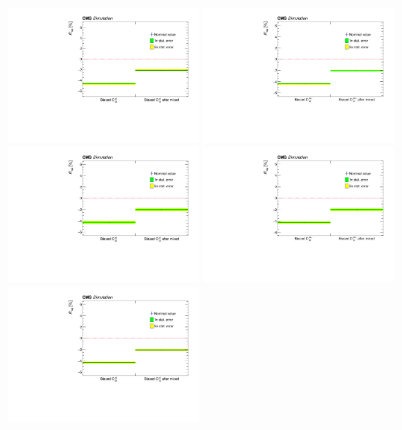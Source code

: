 \begin{figure}

    \centering
    \includegraphics[width=0.45\textwidth]{figure/SimAcp_16_el_ttbar_semi_Obs12_Acp_0_mixed_bias_0.pdf}
    \includegraphics[width=0.45\textwidth]{figure/SimAcp_16_mu_ttbar_semi_Obs12_Acp_0_mixed_bias_0.pdf}
    \includegraphics[width=0.45\textwidth]{figure/SimAcp_17_el_ttbar_semi_Obs12_Acp_0_mixed_bias_0.pdf}
    \includegraphics[width=0.45\textwidth]{figure/SimAcp_17_mu_ttbar_semi_Obs12_Acp_0_mixed_bias_0.pdf}
    \includegraphics[width=0.45\textwidth]{figure/SimAcp_18_el_ttbar_semi_Obs12_Acp_0_mixed_bias_0.pdf}

\end{figure}
